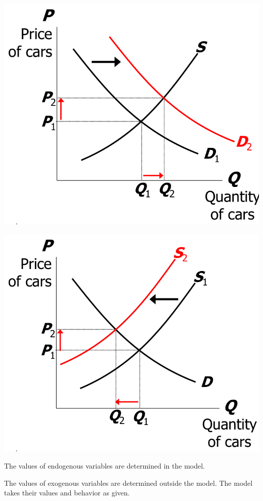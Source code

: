 \documentclass[lang=cn,10pt,green]{elegantbook}
\begin{document}
\begin{minipage}{0.48\textwidth}
    \centering
    \includegraphics[width=0.8\linewidth]{image/The effects of an increase in income1.png}
\end{minipage}%
\begin{minipage}{0.48\textwidth}
    \centering
    \includegraphics[width=0.8\linewidth]{image/The effects of a steel price increase1.png}
\end{minipage}

\begin{definition}
    The values of endogenous variables are determined in the model.
\end{definition}
\begin{definition}
    The values of exogenous variables are determined outside the model. The model takes their values and behavior as given.
\end{definition}
\end{document}
